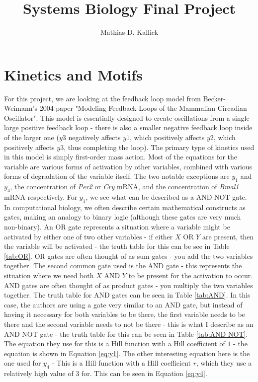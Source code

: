 \documentclass[]{article}
\title{Systems Biology Final Project}
\author{Mathias D. Kallick}
\begin{document}
	
	\maketitle
	
	\section{Kinetics and Motifs}
	For this project, we are looking at the feedback loop model from Becker-Weimann's 2004 paper "Modeling Feedback Loops of the Mammalian Circadian Oscillator". This model is essentially designed to create oscillations from a single large positive feedback loop - there is also a smaller negative feedback loop inside of the larger one ($y3$ negatively affects $y1$, which positively affects $y2$, which positively affects $y3$, thus completing the loop). The primary type of kinetics used in this model is simply first-order mass action. Most of the equations for the variable are various forms of activation by other variables, combined with various forms of degradation of the variable itself. The two notable exceptions are $y_1$ and $y_4$, the concentration of \textit{Per2} or \textit{Cry} mRNA, and the concentration of \textit{Bmal1} mRNA respectively. For $y_1$, we see what can be described as a AND NOT gate. In computational biology, we often describe certain mathematical constructs as gates, making an analogy to binary logic (although these gates are very much non-binary). An OR gate represents a situation where a variable might be activated by either one of two other variables - if either $X$ OR $Y$ are present, then the variable will be activated - the truth table for this can be see in Table \ref{tab:OR}. OR gates are often thought of as sum gates - you add the two variables together. The second common gate used is the AND gate - this represents the situation where we need both $X$ AND $Y$ to be present for the activation to occur. AND gates are often thought of as product gates - you multiply the two variables together. The truth table for AND gates can be seen in Table \ref{tab:AND}. In this case, the authors are using a gate very similar to an AND gate, but instead of having it necessary for both variables to be there, the first variable needs to be there and the second variable needs to not be there - this is what I describe as an AND NOT gate - the truth table for this can be seen in Table \ref{tab:AND NOT}. The equation they use for this is a Hill function with a Hill coefficient of $1$ - the equation is shown in Equation \ref{eq:y1}. The other interesting equation here is the one used for $y_4$ - This is a Hill function with a Hill coefficient $r$, which they use a relatively high value of $3$ for. This can be seen in Equation \ref{eq:y4}.
\end{document}
